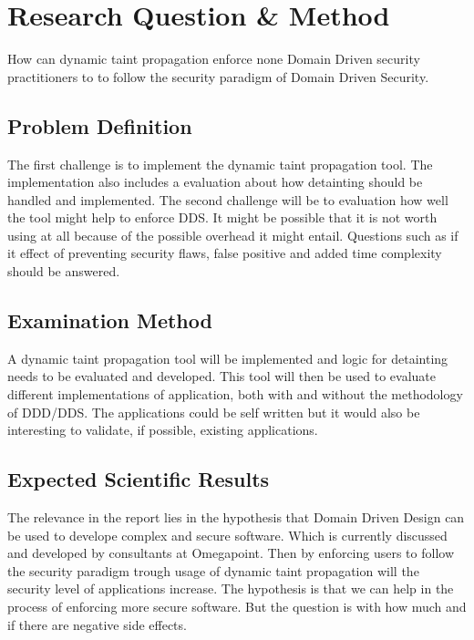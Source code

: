 \documentclass{../kththesis}
\begin{document}
\chapter{Research Question \& Method}
How can dynamic taint propagation enforce none Domain Driven security practitioners to to follow the security paradigm of Domain Driven Security.


\section{Problem Definition}
The first challenge is to implement the dynamic taint propagation tool. The implementation also includes a evaluation about how detainting should be handled and implemented. The second challenge will be to evaluation how well the tool might help to enforce DDS. It might be possible that it is not worth using at all because of the possible overhead it might entail. Questions such as if it effect of preventing security flaws, false positive and added time complexity should be answered.


\section{Examination Method}
A dynamic taint propagation tool will be implemented and logic for detainting needs to be evaluated and developed. This tool will then be used to evaluate different implementations of application, both with and without the methodology of DDD/DDS. The applications could be self written but it would also be interesting to validate, if possible, existing applications.


\section{Expected Scientific Results}
The relevance in the report lies in the hypothesis that Domain Driven Design can be used to develope complex and secure software. Which is currently discussed and developed by consultants at Omegapoint. Then by enforcing users to follow the security paradigm trough usage of dynamic taint propagation will the security level of applications increase. The hypothesis is that we can help in the process of enforcing more secure software. But the question is with how much and if there are negative side effects.
\end{document}
